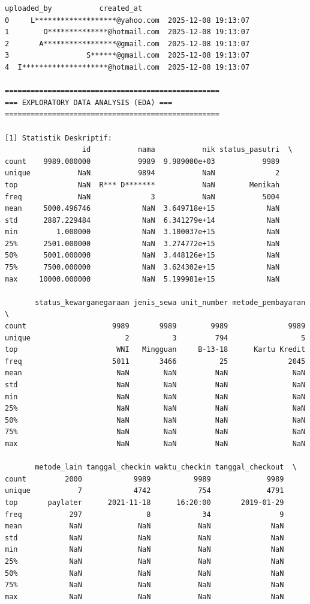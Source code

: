 \begin{lstlisting}[caption={Output 12}]
                         uploaded_by           created_at  
0     L*******************@yahoo.com  2025-12-08 19:13:07  
1        O**************@hotmail.com  2025-12-08 19:13:07  
2       A*****************@gmail.com  2025-12-08 19:13:07  
3                  S******@gmail.com  2025-12-08 19:13:07  
4  I********************@hotmail.com  2025-12-08 19:13:07  

==================================================
=== EXPLORATORY DATA ANALYSIS (EDA) ===
==================================================

[1] Statistik Deskriptif:
                  id           nama           nik status_pasutri  \
count    9989.000000           9989  9.989000e+03           9989   
unique           NaN           9894           NaN              2   
top              NaN  R*** D*******           NaN        Menikah   
freq             NaN              3           NaN           5004   
mean     5000.496746            NaN  3.649718e+15            NaN   
std      2887.229484            NaN  6.341279e+14            NaN   
min         1.000000            NaN  3.100037e+15            NaN   
25%      2501.000000            NaN  3.274772e+15            NaN   
50%      5001.000000            NaN  3.448126e+15            NaN   
75%      7500.000000            NaN  3.624302e+15            NaN   
max     10000.000000            NaN  5.199981e+15            NaN   

       status_kewarganegaraan jenis_sewa unit_number metode_pembayaran  \
count                    9989       9989        9989              9989   
unique                      2          3         794                 5   
top                       WNI   Mingguan     B-13-18      Kartu Kredit   
freq                     5011       3466          25              2045   
mean                      NaN        NaN         NaN               NaN   
std                       NaN        NaN         NaN               NaN   
min                       NaN        NaN         NaN               NaN   
25%                       NaN        NaN         NaN               NaN   
50%                       NaN        NaN         NaN               NaN   
75%                       NaN        NaN         NaN               NaN   
max                       NaN        NaN         NaN               NaN   

       metode_lain tanggal_checkin waktu_checkin tanggal_checkout  \
count         2000            9989          9989             9989   
unique           7            4742           754             4791   
top       paylater      2021-11-18      16:20:00       2019-01-29   
freq           297               8            34                9   
mean           NaN             NaN           NaN              NaN   
std            NaN             NaN           NaN              NaN   
min            NaN             NaN           NaN              NaN   
25%            NaN             NaN           NaN              NaN   
50%            NaN             NaN           NaN              NaN   
75%            NaN             NaN           NaN              NaN   
max            NaN             NaN           NaN              NaN   


\end{lstlisting}
